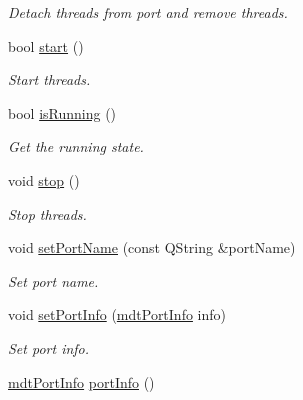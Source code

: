 \begin{DoxyCompactItemize}
\begin{DoxyCompactList}\small\item\em Detach threads from port and remove threads. \end{DoxyCompactList}\item 
bool \hyperlink{classmdt_port_manager_af1fb103ffafc227337a59c7e82f44fbc}{start} ()
\begin{DoxyCompactList}\small\item\em Start threads. \end{DoxyCompactList}\item 
bool \hyperlink{classmdt_port_manager_af460167e604b8b6e2e933a98b2b6b5a2}{isRunning} ()
\begin{DoxyCompactList}\small\item\em Get the running state. \end{DoxyCompactList}\item 
void \hyperlink{classmdt_port_manager_aacbf87cc3d9c37c87e21696f8a6514bd}{stop} ()
\begin{DoxyCompactList}\small\item\em Stop threads. \end{DoxyCompactList}\item 
void \hyperlink{classmdt_port_manager_a2b2ed690cbba9f544c6ac1b46684e59a}{setPortName} (const QString \&portName)
\begin{DoxyCompactList}\small\item\em Set port name. \end{DoxyCompactList}\item 
void \hyperlink{classmdt_port_manager_a7e2ef93ec2731e66aa2b2d5f7ce9bc1c}{setPortInfo} (\hyperlink{classmdt_port_info}{mdtPortInfo} info)
\begin{DoxyCompactList}\small\item\em Set port info. \end{DoxyCompactList}\item 
\hypertarget{classmdt_port_manager_a88109b455fc5a5f5adf0636f7450143e}{
\hyperlink{classmdt_port_info}{mdtPortInfo} \hyperlink{classmdt_port_manager_a88109b455fc5a5f5adf0636f7450143e}{portInfo} ()}
\label{classmdt_port_manager_a88109b455fc5a5f5adf0636f7450143e}


\end{DoxyCompactItemize}
